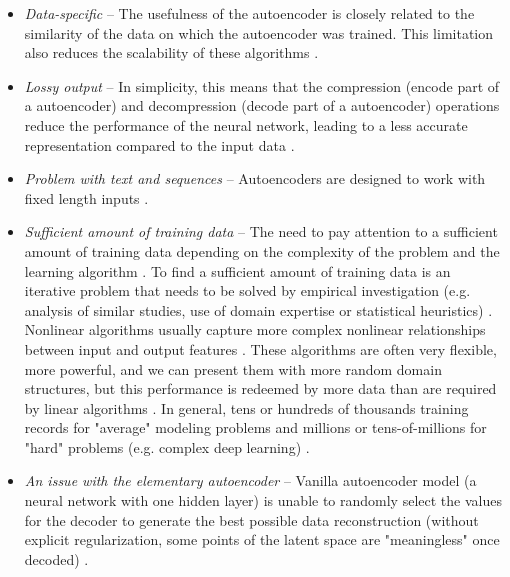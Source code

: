 		\begin{itemize}
			\item \emph{Data-specific} -- The usefulness of the autoencoder is closely related to the similarity of the data on which the autoencoder was trained. This limitation also reduces the scalability of these algorithms \cite{Purkait2019}.
			\item \emph{Lossy output} -- In simplicity, this means that the compression (encode part of a autoencoder) and decompression (decode part of a autoencoder) operations reduce the performance of the neural network, leading to a less accurate representation compared to the input data \cite{Purkait2019}.
			\item \emph{Problem with text and sequences} -- Autoencoders are designed to work with fixed length inputs \cite{Brownlee2018}.
			\item \emph{Sufficient amount of training data} -- The need to pay attention to a sufficient amount of training data depending on the complexity of the problem and the learning algorithm \cite{Brownlee2017a}. To find a sufficient amount of training data is an iterative problem that needs to be solved by empirical investigation (e.g. analysis of similar studies, use of domain expertise or statistical heuristics) \cite{Brownlee2017a}. Nonlinear algorithms usually capture more complex nonlinear relationships between input and output features \cite{Brownlee2017a}. These algorithms are often very flexible, more powerful, and we can present them with more random domain structures, but this performance is redeemed by more data than are required by linear algorithms \cite{Brownlee2017a}. In general, tens or hundreds of thousands training records for "average" modeling problems and millions or tens-of-millions for "hard" problems (e.g. complex deep learning) \cite{Brownlee2017a}.
			\item \emph{An issue with the elementary autoencoder} -- Vanilla autoencoder model (a neural network with one hidden layer) is unable to randomly select the values for the decoder to generate the best possible data reconstruction (without explicit regularization, some points of the latent space are "meaningless" once decoded) \cite{Rocca2019}.
		\end{itemize}

